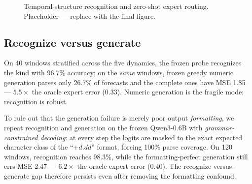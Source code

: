 \documentclass{article}
\begin{document}
\begin{figure}[t]
\centering
\caption{Temporal-structure recognition and zero-shot expert routing.
Placeholder --- replace with the final figure.}
\label{fig:main}
\end{figure}

\subsection{Recognize versus generate}\label{sec:e3}
On 40 windows stratified across the five dynamics, the frozen probe recognizes
the kind with 96.7\% accuracy; on the \emph{same} windows, frozen greedy
numeric generation parses only 26.7\% of forecasts and the complete ones have
MSE 1.85 --- $5.5\times$ the oracle expert error (0.33).  Numeric generation is
the fragile mode; recognition is robust.

To rule out that the generation failure is merely poor output \emph{formatting},
we repeat recognition and generation on the frozen Qwen3-0.6B with
\emph{grammar-constrained decoding}: at every step the logits are masked to the
exact expected character class of the ``$+d.dd$'' format, forcing 100\% parse
coverage.  On 120 windows, recognition reaches 98.3\%, while the
formatting-perfect generation still errs MSE 2.47 --- $6.2\times$ the oracle
expert error (0.40).  The recognize-versus-generate gap therefore persists even
after removing the formatting confound.
\end{document}
